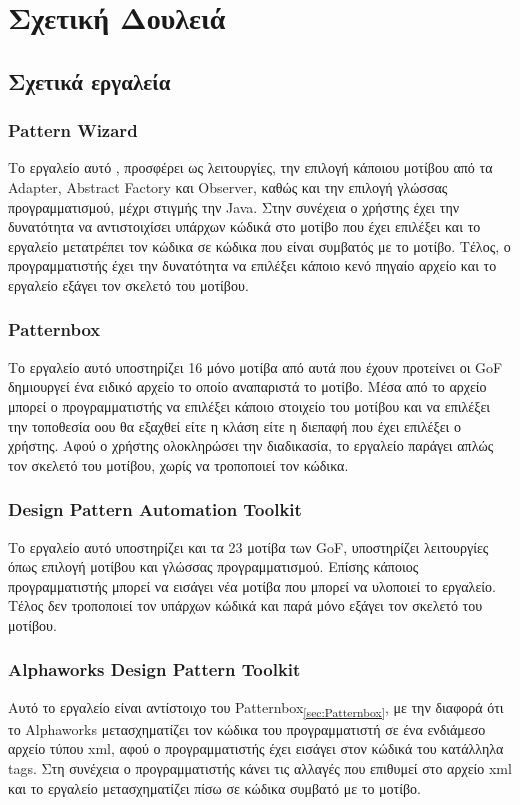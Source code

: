 \chapter{Σχετική Δουλειά}
\label{ch:relativeWork}
\section{Σχετικά εργαλεία}
\label{sec:relativeTools}
\subsection{Pattern Wizard}
\label{subsec:patternWizard}
Το εργαλείο αυτό \cite{PatternBox}, προσφέρει ως λειτουργίες, την επιλογή κάποιου μοτίβου 
από τα Adapter, Abstract Factory και Observer, καθώς και την επιλογή γλώσσας προγραμματισμού, μέχρι στιγμής την Java. Στην συνέχεια 
ο χρήστης έχει την δυνατότητα να αντιστοιχίσει υπάρχων κώδικά στο μοτίβο που έχει επιλέξει και το εργαλείο μετατρέπει τον κώδικα 
σε κώδικα που είναι συμβατός με το μοτίβο. Τέλος, ο προγραμματιστής έχει την δυνατότητα να επιλέξει κάποιο κενό πηγαίο αρχείο και 
το εργαλείο εξάγει τον σκελετό του μοτίβου.
\subsection{Patternbox}
\label{subsec:Patternbox}
Το εργαλείο αυτό \cite{PatternBox} υποστηρίζει 16 μόνο μοτίβα από αυτά που έχουν προτείνει οι GoF\textsubscript{\cite{GoF}} δημιουργεί ένα ειδικό 
αρχείο το οποίο αναπαριστά το μοτίβο. Μέσα από το αρχείο μπορεί ο προγραμματιστής να επιλέξει κάποιο στοιχείο του μοτίβου και 
να επιλέξει την τοποθεσία οου θα εξαχθεί είτε η κλάση είτε η διεπαφή που έχει επιλέξει ο χρήστης. 
Αφού ο χρήστης ολοκληρώσει την διαδικασία, το εργαλείο παράγει απλώς τον σκελετό του μοτίβου, χωρίς να τροποποιεί τον κώδικα.
\subsection{Design Pattern Automation Toolkit}
\label{subsec:dpa}
Το εργαλείο αυτό \cite{PatternBox} υποστηρίζει και τα 23 μοτίβα των GoF\textsubscript{\cite{GoF}}, υποστηρίζει λειτουργίες 
όπως επιλογή μοτίβου και γλώσσας προγραμματισμού. Επίσης κάποιος προγραμματιστής μπορεί να εισάγει νέα μοτίβα που μπορεί να 
υλοποιεί το εργαλείο.
Τέλος δεν τροποποιεί τον υπάρχων κώδικά και παρά μόνο εξάγει τον σκελετό του μοτίβου.
\subsection{Alphaworks Design Pattern Toolkit}
\label{subsec:ALPHAWORKS}
Αυτό το εργαλείο \cite{PatternBox} είναι αντίστοιχο του Patternbox\textsubscript{\ref{sec:Patternbox}}, με την διαφορά ότι το Alphaworks 
μετασχηματίζει τον κώδικα
του προγραμματιστή σε ένα ενδιάμεσο αρχείο τύπου xml, αφού ο προγραμματιστής έχει εισάγει στον κώδικά του κατάλληλα tags.
Στη συνέχεια ο προγραμματιστής κάνει τις αλλαγές που επιθυμεί στο αρχείο xml και το εργαλείο μετασχηματίζει πίσω σε κώδικα συμβατό με το 
μοτίβο.

